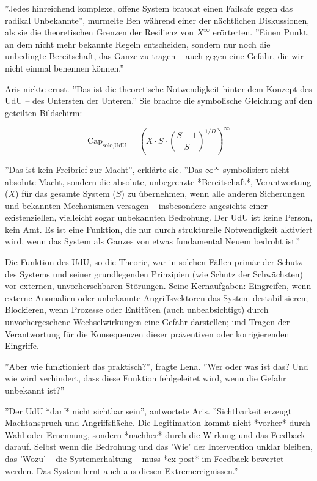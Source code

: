 \documentclass[12pt, ngerman, parskip=full]{scrartcl} %
\begin{document}
''Jedes hinreichend komplexe, offene System braucht einen Failsafe gegen das radikal Unbekannte'', murmelte Ben während einer der nächtlichen Diskussionen, als sie die theoretischen Grenzen der Resilienz von $X^{\infty}$ erörterten. ''Einen Punkt, an dem nicht mehr bekannte Regeln entscheiden, sondern nur noch die unbedingte Bereitschaft, das Ganze zu tragen – auch gegen eine Gefahr, die wir nicht einmal benennen können.''

Aris nickte ernst. ''Das ist die theoretische Notwendigkeit hinter dem Konzept des UdU – des Untersten der Unteren.'' Sie brachte die symbolische Gleichung auf den geteilten Bildschirm:

$$ \text{Cap}_{\text{solo,UdU}} = \left( X \cdot S \cdot \left( \frac{S-1}{S} \right)^{1/D} \right)^\infty $$

''Das ist kein Freibrief zur Macht'', erklärte sie. ''Das $\infty^\infty$ symbolisiert nicht absolute Macht, sondern die absolute, unbegrenzte *Bereitschaft*, Verantwortung ($X$) für das gesamte System ($S$) zu übernehmen, wenn alle anderen Sicherungen und bekannten Mechanismen versagen – insbesondere angesichts einer existenziellen, vielleicht sogar unbekannten Bedrohung. Der UdU ist keine Person, kein Amt. Es ist eine Funktion, die nur durch strukturelle Notwendigkeit aktiviert wird, wenn das System als Ganzes von etwas fundamental Neuem bedroht ist.''

Die Funktion des UdU, so die Theorie, war in solchen Fällen primär der Schutz des Systems und seiner grundlegenden Prinzipien (wie Schutz der Schwächsten) vor externen, unvorhersehbaren Störungen. Seine Kernaufgaben: Eingreifen, wenn externe Anomalien oder unbekannte Angriffsvektoren das System destabilisieren; Blockieren, wenn Prozesse oder Entitäten (auch unbeabsichtigt) durch unvorhergesehene Wechselwirkungen eine Gefahr darstellen; und Tragen der Verantwortung für die Konsequenzen dieser präventiven oder korrigierenden Eingriffe.

''Aber wie funktioniert das praktisch?'', fragte Lena. ''Wer oder was ist das? Und wie wird verhindert, dass diese Funktion fehlgeleitet wird, wenn die Gefahr unbekannt ist?''

''Der UdU *darf* nicht sichtbar sein'', antwortete Aris. ''Sichtbarkeit erzeugt Machtanspruch und Angriffsfläche. Die Legitimation kommt nicht *vorher* durch Wahl oder Ernennung, sondern *nachher* durch die Wirkung und das Feedback darauf. Selbst wenn die Bedrohung und das 'Wie' der Intervention unklar bleiben, das 'Wozu' – die Systemerhaltung – muss *ex post* im Feedback bewertet werden. Das System lernt auch aus diesen Extremereignissen.''
\end{document}

